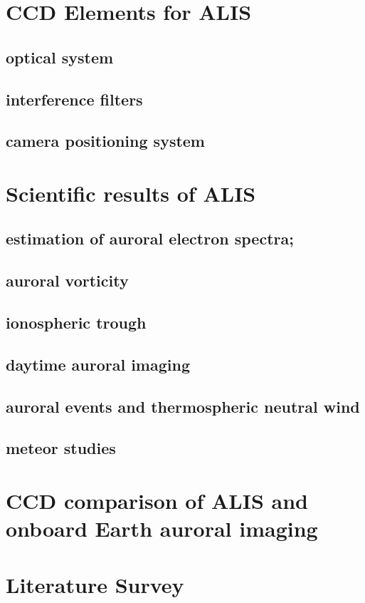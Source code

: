 \section{CCD Elements for ALIS}

\subsection{optical system}

\subsection{interference filters}

\subsection{camera positioning system}


\section{Scientific results of ALIS}

\subsection{estimation of auroral electron spectra;}

\subsection{auroral vorticity}

\subsection{ionospheric trough}

\subsection{daytime auroral imaging}

\subsection{auroral events and thermospheric neutral wind}

\subsection{meteor studies}



\section{CCD comparison of ALIS and onboard Earth auroral imaging}


\section{Literature Survey}





